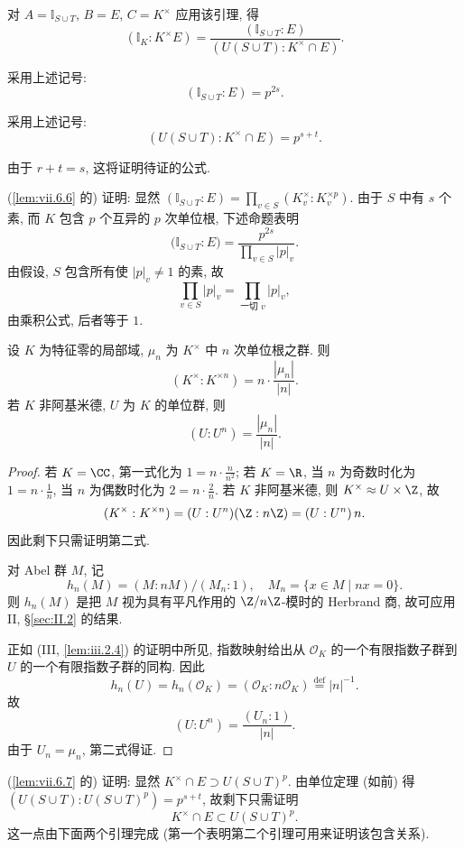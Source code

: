 对 $A=\mathbb{I}_{S\cup T}$, $B=E$, $C=K^{\times}$ 应用该引理, 得
\[
(\mathbb{I}_{K}:K^{\times}E)=\frac{(\mathbb{I}_{S\cup T}:E)}{(U(S\cup T):K^{\times}\cap E)}.
\]

\begin{lemma}\label{lem:vii.6.6}
采用上述记号:
\[
(\mathbb{I}_{S\cup T}:E)=p^{2s}.
\]
\end{lemma}

\begin{lemma}\label{lem:vii.6.7}
采用上述记号:
\[
(U(S\cup T):K^{\times}\cap E)=p^{s+t}.
\]
\end{lemma}

由于 $r+t=s$, 这将证明待证的公式.

(\ref{lem:vii.6.6} 的) 证明: 显然 $(\mathbb{I}_{S\cup T}:E)=\prod_{v\in S}(K_{v}^{\times}:K_{v}^{\times p})$. 由于 $S$ 中有 $s$ 个素, 而 $K$ 包含 $p$ 个互异的 $p$ 次单位根, 下述命题表明
\[
\bigl(\mathbb{I}_{S\cup T}:E\bigr)=\frac{p^{2s}}{\prod_{v\in S}|p|_{v}}.
\]
由假设, $S$ 包含所有使 $|p|_{v}\ne1$ 的素, 故
\[
\prod_{v\in S}|p|_{v}=\prod_{\text{一切 }v}|p|_{v},
\]
由乘积公式, 后者等于 $1$.

\begin{proposition}\label{prop:vii.6.8}
设 $K$ 为特征零的局部域, $\mu_n$ 为 $K^{\times}$ 中 $n$ 次单位根之群. 则
\[
(K^{\times}:K^{\times n})=n\cdot\frac{|\mu_{n}|}{|n|}.
\]
若 $K$ 非阿基米德, $U$ 为 $K$ 的单位群, 则
\[
(U:U^{n})=\frac{|\mu_{n}|}{|n|}.
\]
\end{proposition}

\begin{proof}
若 $K=\CC$, 第一式化为 $1=n\cdot\frac{n}{n^{2}}$; 若 $K=\R$, 当 $n$ 为奇数时化为 $1=n\cdot\frac{1}{n}$, 当 $n$ 为偶数时化为 $2=n\cdot\frac{2}{n}$. 若 $K$ 非阿基米德, 则 $K^{\times}\approx U\times\Z$, 故
\[
(K^{\times}:K^{\times n})=(U:U^{n})(\Z:n\Z)=(U:U^{n})\,n.
\]
因此剩下只需证明第二式.

对 Abel 群 $M$, 记
\[
h_{n}(M)=(M:nM)/(M_{n}:1),\quad M_{n}=\{x\in M\mid nx=0\}.
\]
则 $h_n(M)$ 是把 $M$ 视为具有平凡作用的 $\Z/n\Z$-模时的 Herbrand 商, 故可应用 II, \S\ref{sec:II.2} 的结果.

正如 (III, \ref{lem:iii.2.4}) 的证明中所见, 指数映射给出从 $\mathcal{O}_K$ 的一个有限指数子群到 $U$ 的一个有限指数子群的同构. 因此
\[
h_{n}(U)=h_{n}(\mathcal{O}_{K})=(\mathcal{O}_{K}:n\mathcal{O}_{K})\overset{\mathrm{def}}{=}|n|^{-1}.
\]
故
\[
(U:U^{n})=\frac{(U_{n}:1)}{|n|}.
\]
由于 $U_{n}=\mu_{n}$, 第二式得证.
\end{proof}

(\ref{lem:vii.6.7} 的) 证明: 显然 $K^{\times}\cap E\supset U(S\cup T)^{p}$. 由单位定理 (如前) 得 $(U(S\cup T):U(S\cup T)^{p})=p^{s+t}$, 故剩下只需证明
\[
K^{\times}\cap E\subset U(S\cup T)^{p}.
\]
这一点由下面两个引理完成 (第一个表明第二个引理可用来证明该包含关系).

